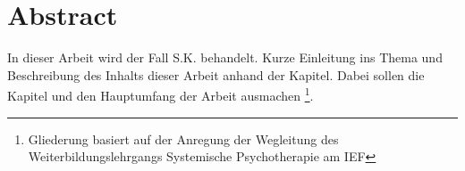 \section{Abstract}\label{Abstract}
In dieser Arbeit wird der Fall S.K. behandelt. Kurze Einleitung ins Thema und Beschreibung des Inhalts dieser Arbeit anhand der Kapitel. Dabei sollen die Kapitel  und  den Hauptumfang der Arbeit ausmachen \footnote{Gliederung basiert auf der Anregung der Wegleitung des Weiterbildungslehrgangs Systemische Psychotherapie am IEF}.  